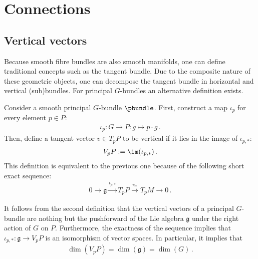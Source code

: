 \section{Connections}\label{section:connections}
\subsection{Vertical vectors}

    Because smooth fibre bundles are also smooth manifolds, one can define traditional concepts such as the tangent bundle. Due to the composite nature of these geometric objects, one can decompose the tangent bundle in horizontal and vertical (sub)bundles.
    For principal $G$-bundles an alternative definition exists.
    \begin{adefinition}
        Consider a smooth principal $G$-bundle $\pbundle$. First, construct a map $\iota_p$ for every element $p\in P$:
        \begin{gather}
            \iota_p:G\rightarrow P:g\mapsto p\cdot g\,.
        \end{gather}
        Then, define a tangent vector $v\in T_pP$ to be vertical if it lies in the image of $\iota_{p,\ast}$:
        \begin{gather}
            V_pP := \im(\iota_{p,\ast})\,.
        \end{gather}
        This definition is equivalent to the previous one because of the following short exact sequence:
        \begin{gather}
            \label{bundle:principal_bundle_exact_sequence}
            0\longrightarrow\mathfrak{g}\overset{\iota_{p,\ast}}{\longrightarrow}T_pP\overset{\pi_\ast}{\longrightarrow}T_pM\longrightarrow0\,.
        \end{gather}
    \end{adefinition}

    \begin{property}[Dimension]\label{bundle:vertical_dimension}
        It follows from the second definition that the vertical vectors of a principal $G$-bundle are nothing but the pushforward of the Lie algebra $\mathfrak{g}$ under the right action of $G$ on $P$. Furthermore, the exactness of the sequence implies that $\iota_{p,\ast}:\mathfrak{g}\rightarrow V_pP$ is an isomorphism of vector spaces. In particular, it implies that
        \begin{gather}
            \dim(V_pP) = \dim(\mathfrak{g}) = \dim(G)\,.
        \end{gather}
    \end{property}

